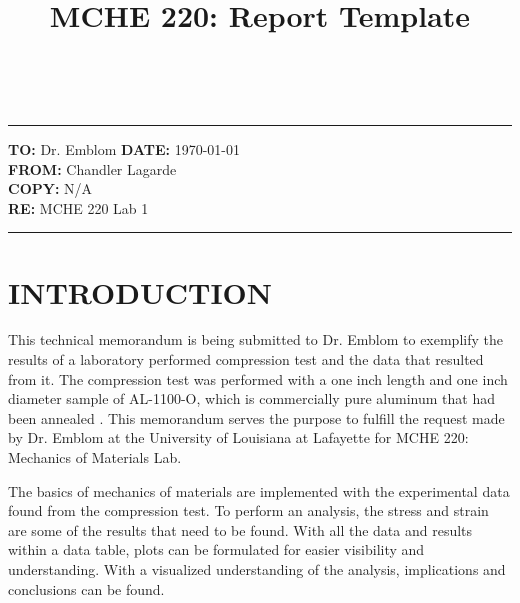 \documentclass[12pt]{article}
\title{MCHE 220: Report Template}
\begin{document}
\fancyhf{} 	
	\renewcommand{\headrulewidth}{0pt}
  	\pagestyle{plain}
    
\captionsetup[table]{labelsep=space}

\begin{flushleft}
\hrulefill\\\hrule height 1pt
\vspace{5pt}
\textbf{TO: }Dr. Emblom  \hfill   \textbf{DATE: }\today                
\bigskip\\
\textbf{FROM: }Chandler Lagarde	
\bigskip\\
\textbf{COPY: }N/A
\bigskip\\
\textbf{RE: }MCHE 220 Lab 1
\vspace{-10pt}
\end{flushleft}
\hrulefill \hrule height 1pt


\section*{\fontsize{12}{12}\selectfont INTRODUCTION}
This technical memorandum is being submitted to Dr. Emblom to exemplify the results of a laboratory performed compression test and the data that resulted from it. The compression test was performed with a one inch length and one inch diameter sample of AL-1100-O, which is commercially pure aluminum that had been annealed \cite{Holt}. This memorandum serves the purpose to fulfill the request made by Dr. Emblom at the University of Louisiana at Lafayette for MCHE 220: Mechanics of Materials Lab.
\bigskip

The basics of mechanics of materials are implemented with the experimental data found from the compression test. To perform an analysis, the stress and strain are some of the results that need to be found. With all the data and results within a data table, plots can be formulated for easier visibility and understanding. With a visualized understanding of the analysis, implications and conclusions can be found.
\bigskip
\end{document}
